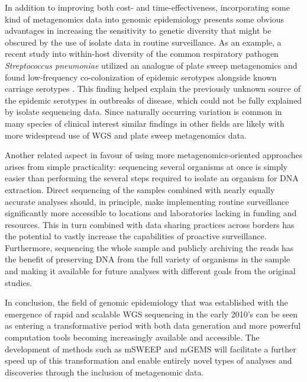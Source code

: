 \documentclass[officiallayout]{tktla}
\begin{document}
In addition to improving both cost- and time-effectiveness,
incorporating some kind of metagenomics data into genomic epidemiology
presents some obvious advantages in increasing the sensitivity to
genetic diversity that might be obscured by the use of isolate data in
routine surveillance. As an example, a recent study into within-host
diversity of the common respiratory pathogen \textit{Streptococcus
  pneumoniae} utilized an analogue of plate sweep metagenomics and
found low-frequency co-colonization of epidemic serotypes alongside
known carriage serotypes \citep{tonkin-hill_pneumococcal_2022}. This
finding helped explain the previously unknown source of the epidemic
serotypes in outbreaks of disease, which could not be fully explained
by isolate sequencing data. Since naturally occurring variation is
common in many species of clinical interest
\citep{paterson2015capturing, zlitni2020strain, dixit2018within,
  mosavie2019sampling, tonkin-hill_pneumococcal_2022} similar findings
in other fields are likely with more widespread use of WGS and plate
sweep metagenomics data.

Another related aspect in favour of using more metagenomics-oriented
approaches arises from simple practicality: sequencing several
organisms at once is simply easier than performing the several steps
required to isolate an organism for DNA extraction. Direct sequencing
of the samples combined with nearly equally accurate analyses should,
in principle, make implementing routine surveillance significantly
more accessible to locations and laboratories lacking in funding and
resources. This in turn combined with data sharing practices across
borders has the potential to vastly increase the capabilities of
proactive surveillance. Furthermore, sequencing the whole sample and
publicly archiving the reads has the benefit of preserving DNA from
the full variety of organisms in the sample and making it available
for future analyses with different goals from the original studies.

In conclusion, the field of genomic epidemiology that was established
with the emergence of rapid and scalable WGS sequencing in the early
2010's can be seen as entering a transformative period with both data
generation and more powerful computation tools becoming increasingly
available and accessible. The development of methods such as mSWEEP
and mGEMS will facilitate a further speed up of this transformation and
enable entirely novel types of analyses and discoveries through the
inclusion of metagenomic data.
\end{document}
